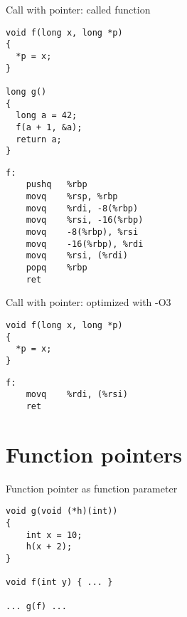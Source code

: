 \documentclass[landscape]{beamer}
\begin{document}
\begin{frame}[fragile]{Call with pointer: called function}
\begin{minipage}{.5\textwidth}
\begin{verbatim}
void f(long x, long *p)
{
  *p = x;
}

long g()
{
  long a = 42;
  f(a + 1, &a);
  return a;
}
\end{verbatim}
\end{minipage}
%
\begin{minipage}{.4\textwidth}
\begin{verbatim}
f:  
	pushq	%rbp
	movq	%rsp, %rbp
	movq	%rdi, -8(%rbp)
	movq	%rsi, -16(%rbp)
	movq	-8(%rbp), %rsi
	movq	-16(%rbp), %rdi
	movq	%rsi, (%rdi)
	popq	%rbp
	ret
\end{verbatim}
\end{minipage}
\end{frame}

\begin{frame}[fragile]{Call with pointer: optimized with -O3}
\begin{minipage}{.5\textwidth}
\begin{verbatim}
void f(long x, long *p)
{
  *p = x;
}

\end{verbatim}
\end{minipage}
%
\begin{minipage}{.4\textwidth}
\begin{verbatim}
f:  
	movq	%rdi, (%rsi)
	ret
\end{verbatim}
\end{minipage}
\end{frame}

\section{Function pointers}


\begin{frame}[fragile]{Function pointer as function parameter}
\begin{verbatim}
void g(void (*h)(int))
{
    int x = 10;
    h(x + 2);
}
    
void f(int y) { ... }

... g(f) ...
\end{verbatim}

  
\end{frame}   
\end{document}
